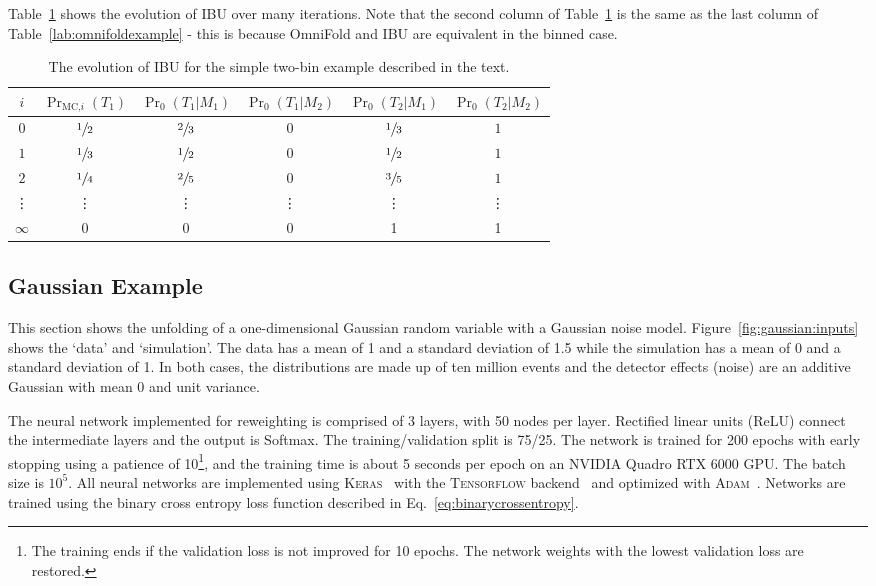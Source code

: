 Table~\ref{lab:ibuexample} shows the evolution of IBU over many iterations.  Note that the second column of Table~\ref{lab:ibuexample} is the same as the last column of Table~\ref{lab:omnifoldexample} - this is because OmniFold and IBU are equivalent in the binned case.

\begin{table}[h!]
\centering
\begin{tabular}{|cccccc| }
\hline
$i$ & $\Pr_\text{MC,$i$}(T_1)$ & $\Pr_0(T_1|M_1)$ & $\Pr_0(T_1|M_2)$ & $\Pr_0(T_2|M_1)$ & $\Pr_0(T_2|M_2)$\\
\hline
$0$ & $\sfrac{1}{2}$ & $\sfrac{2}{3}$ & 0 & $\sfrac{1}{3}$ & $1$\\
$1$ & $\sfrac{1}{3}$ & $\sfrac{1}{2}$ & 0 & $\sfrac{1}{2}$ & $1$\\
$2$ & $\sfrac{1}{4}$ & $\sfrac{2}{5}$ & 0 & $\sfrac{3}{5}$ & $1$\\
\vdots & \vdots & \vdots & \vdots & \vdots & \vdots  \\
$\infty$ & 0 & 0 & 0 & 1 & 1\\
\hline
\end{tabular}
\caption{The evolution of IBU for the simple two-bin example described in the text.}
\label{lab:ibuexample}
\end{table}

\subsection{Gaussian Example}

This section shows the unfolding of a one-dimensional Gaussian random variable with a Gaussian noise model.  Figure~\ref{fig:gaussian:inputs} shows the `data' and `simulation'.  The data has a mean of 1 and a standard deviation of 1.5 while the simulation has a mean of 0 and a standard deviation of 1.  In both cases, the distributions are made up of ten million events and the detector effects (noise) are an additive Gaussian with mean 0 and unit variance.

The neural network implemented for reweighting is comprised of 3 layers, with 50 nodes per layer.  Rectified linear units (ReLU) connect the intermediate layers and the output is Softmax.  The training/validation split is 75/25.  The network is trained for 200 epochs with early stopping using a patience of 10\footnote{The training ends if the validation loss is not improved for 10 epochs.  The network weights with the lowest validation loss are restored.}, and the training time is about 5 seconds per epoch on an NVIDIA Quadro RTX 6000 GPU. The batch size is $10^5$.  All neural networks are implemented using \textsc{Keras}~\cite{keras} with the \textsc{Tensorflow} backend~\cite{tensorflow} and optimized with \textsc{Adam}~\cite{adam}.  Networks are trained using the binary cross entropy loss function described in Eq.~\ref{eq:binarycrossentropy}.


